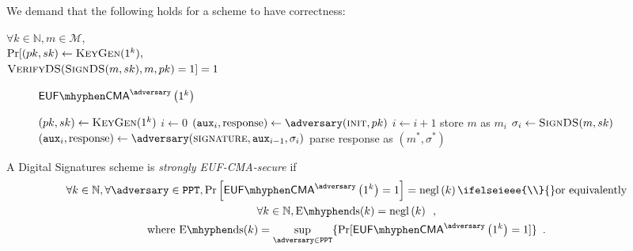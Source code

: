   We demand that the following holds for a scheme to have correctness:

  $\forall k \in \mathbb{N}, m \in \mathcal{M},$ \\
  $\Pr[(pk, sk) \gets \textsc{KeyGen}(1^k),$ \\
  $\textsc{VerifyDS}(\textsc{SignDS}(m, sk), m, pk) = 1] = 1$

  \begin{figure}[!htbp]
    \begin{gamebox}{$\mathsf{EUF \mhyphen CMA}^{\adversary}\left(1^k\right)$}
      \begin{algorithmic}[1]
        \State $(pk, sk) \gets \textsc{KeyGen}(1^k)$
        \State $i \gets 0$
        \State $(\mathtt{aux}_i, \mathrm{response}) \gets
        \adversary(\textsc{init}, pk)$
          \State $i \gets i + 1$
          \State store $m$ as $m_i$
          \State $\sigma_i \gets \textsc{SignDS}(m, sk)$
          \State $(\mathtt{aux}_i, \mathrm{response}) \gets
          \adversary(\textsc{signature}, \mathtt{aux}_{i-1}, \sigma_i)$
        \EndWhile
        \State parse response as $(m^*, \sigma^*)$
          \State {}
        \Else
          \State {}
        \EndIf
      \end{algorithmic}
    \end{gamebox}
    \caption{}
    \label{game:ds}
  \end{figure}
  \begin{definition}
    \label{def:ds:secure}
    A Digital Signatures scheme is \emph{strongly \textsf{EUF-CMA}-secure} if
    \begin{gather*}
      \forall k \in \mathbb{N}, \forall \adversary \in \mathtt{PPT},
      \Pr\left[\mathsf{EUF \mhyphen CMA}^{\adversary}\left(1^k\right) = 1\right]
      = \mathrm{negl}\left(k\right)
      \ifelseieee{\\}{}
      \text{or equivalently} \\
      \forall k \in \mathbb{N}, \mathrm{E \mhyphen ds}(k) =
      \mathrm{negl}\left(k\right) \enspace, \\
      \text{where } \mathrm{E \mhyphen ds}(k) = \underset{\adversary \in
      \mathtt{PPT}}{\sup}\{\Pr[\mathsf{EUF \mhyphen
      CMA}^{\adversary}\left(1^k\right) = 1]\} \enspace.
    \end{gather*}
  \end{definition}
